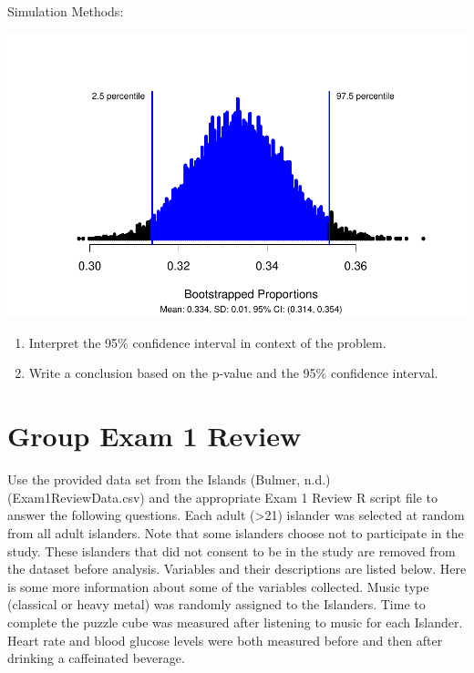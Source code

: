 \documentclass[
]{report}
\begin{document}
\vspace{1in}

\newpage

Simulation Methods:

\begin{center}\includegraphics[width=0.85\linewidth]{05-UR-module4_review_files/figure-latex/unnamed-chunk-4-1} \end{center}

\begin{enumerate}
\def\labelenumi{\arabic{enumi}.}
\setcounter{enumi}{13}
\item
  Interpret the 95\% confidence interval in context of the problem.
  \vspace{0.6in}
\item
  Write a conclusion based on the p-value and the 95\% confidence interval.
\end{enumerate}

\vspace{0.6in}

\newpage

\section{Group Exam 1 Review}\label{group-exam-1-review}

Use the provided data set from the Islands (Bulmer, n.d.) (Exam1ReviewData.csv) and the appropriate Exam 1 Review R script file to answer the following questions. Each adult (\textgreater21) islander was selected at random from all adult islanders. Note that some islanders choose not to participate in the study. These islanders that did not consent to be in the study are removed from the dataset before analysis. Variables and their descriptions are listed below. Here is some more information about some of the variables collected. Music type (classical or heavy metal) was randomly assigned to the Islanders. Time to complete the puzzle cube was measured after listening to music for each Islander. Heart rate and blood glucose levels were both measured before and then after drinking a caffeinated beverage.
\end{document}
